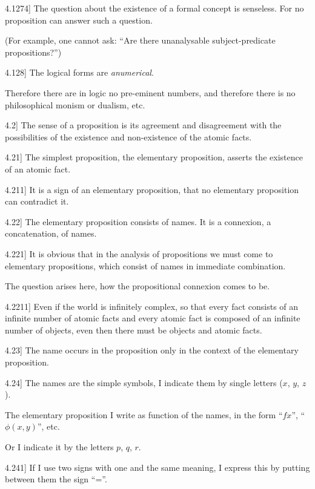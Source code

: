 \documentclass[12pt,oneside]{book}[2007/10/19]
\newcommand{\PropositionE}[2]{%
  \item[\phantomsection\label{PropE:#1}\PropGRef{#1}] #2%
}
\newcommand{\PropGRef}[1]{\hyperref[PropG:#1]{#1}}
\newcommand{\DPtypo}[2]{#2}
\begin{document}
\begin{propositions}
\PropositionE{4.1274}
{The question about the existence of a formal
concept is senseless. For no proposition can
answer such a question.

(For example, one cannot ask: ``Are there
unanalysable sub\-ject-pre\-di\-cate propositions?'')}


\PropositionE{4.128}
{The logical forms are \emph{anumerical}.

Therefore there are in logic no pre-eminent
numbers, and therefore there is no philosophical
monism or dualism, etc.}


\PropositionE{4.2}
{The sense of a proposition is its agreement
and disagreement with the possibilities of the
existence and non-existence of the atomic
facts.}


\PropositionE{4.21}
{The simplest proposition, the elementary proposition,
asserts the existence of an atomic fact.}


\PropositionE{4.211}
{It is a sign of an elementary proposition,
that no elementary proposition can contradict
it.}


\PropositionE{4.22}
{The elementary proposition consists of names.
It is a connexion, a concatenation, of names.}


\PropositionE{4.221}
{It is obvious that in the analysis of propositions
we must come to elementary propositions, which
consist of names in immediate combination.

The question arises here, how the propositional
connexion comes to be.}


\PropositionE{4.2211}
{Even if the world is infinitely complex, so
that every fact consists of an infinite number
of \DPtypo{atomatic}{atomic} facts and every atomic fact is
composed of an infinite number of objects,
even then there must be objects and atomic
facts.}


\PropositionE{4.23}
{The name occurs in the proposition only in
the context of the elementary proposition.}


\PropositionE{4.24}
{The names are the simple symbols, I indicate
them by single letters ($x$, $y$, $z$).

The elementary proposition I write as function
of the names, in the form ``$fx$'', ``$\phi(x,y)$'', etc.

Or I indicate it by the letters $p$, $q$, $r$.}


\PropositionE{4.241}
{If I use two signs with one and the same
meaning, I express this by putting between them
the sign ``=''.

}
\end{propositions}
\end{document}

